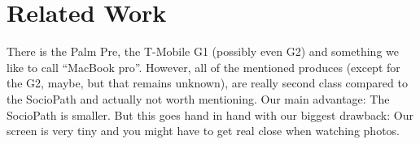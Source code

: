 %
%
%
\section{Related Work}

There is the Palm Pre, the T-Mobile G1 (possibly even G2) and something we like to call ``MacBook pro''.
However, all of the mentioned produces (except for the G2, maybe, but that remains unknown), are really second class
compared to the SocioPath and actually not worth mentioning. Our main advantage: The SocioPath is smaller.
But this goes hand in hand with our biggest drawback: Our screen is very tiny and you might have to get real close
when watching photos.
